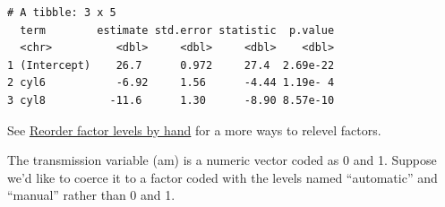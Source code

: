 \documentclass[]{book}
\newenvironment{Shaded}{\begin{snugshade}}{\end{snugshade}}
\newcommand{\CommentTok}[1]{\textcolor[rgb]{0.56,0.35,0.01}{\textit{#1}}}
\newcommand{\DataTypeTok}[1]{\textcolor[rgb]{0.13,0.29,0.53}{#1}}
\newcommand{\DecValTok}[1]{\textcolor[rgb]{0.00,0.00,0.81}{#1}}
\newcommand{\KeywordTok}[1]{\textcolor[rgb]{0.13,0.29,0.53}{\textbf{#1}}}
\newcommand{\NormalTok}[1]{#1}
\newcommand{\OperatorTok}[1]{\textcolor[rgb]{0.81,0.36,0.00}{\textbf{#1}}}
\newcommand{\StringTok}[1]{\textcolor[rgb]{0.31,0.60,0.02}{#1}}
\begin{document}
\begin{Shaded}
\end{Shaded}

\begin{verbatim}
# A tibble: 3 x 5
  term        estimate std.error statistic  p.value
  <chr>          <dbl>     <dbl>     <dbl>    <dbl>
1 (Intercept)    26.7      0.972     27.4  2.69e-22
2 cyl6           -6.92     1.56      -4.44 1.19e- 4
3 cyl8          -11.6      1.30      -8.90 8.57e-10
\end{verbatim}

See \href{https://forcats.tidyverse.org/reference/fct_relevel.html}{Reorder factor levels by hand} for a more ways to relevel factors.

The transmission variable (am) is a numeric vector coded as 0 and 1. Suppose we'd like to coerce it to a factor coded with the levels named ``automatic'' and ``manual'' rather than 0 and 1.

\begin{Shaded}
\end{Shaded}
\end{document}
